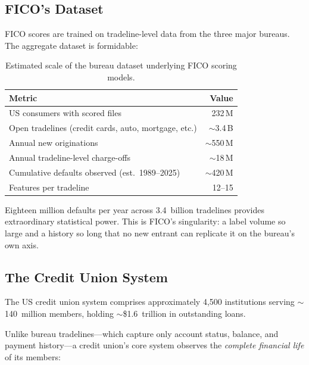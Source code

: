 \documentclass[11pt,twocolumn]{article}
\begin{document}
\subsection{FICO's Dataset}

FICO scores are trained on tradeline-level data from the three major bureaus. The aggregate dataset is formidable:

\begin{table}[H]
\centering
\small
\begin{tabular}{@{}lr@{}}
\toprule
\textbf{Metric} & \textbf{Value} \\
\midrule
US consumers with scored files & 232\,M \\
Open tradelines (credit cards, auto, mortgage, etc.) & $\sim$3.4\,B \\
Annual new originations & $\sim$550\,M \\
Annual tradeline-level charge-offs & $\sim$18\,M \\
Cumulative defaults observed (est.\ 1989--2025) & $\sim$420\,M \\
Features per tradeline & 12--15 \\
\bottomrule
\end{tabular}
\caption{Estimated scale of the bureau dataset underlying FICO scoring models.}
\label{tab:fico}
\end{table}

Eighteen million defaults per year across 3.4~billion tradelines provides extraordinary statistical power. This is FICO's singularity: a label volume so large and a history so long that no new entrant can replicate it on the bureau's own axis.

\subsection{The Credit Union System}

The US credit union system comprises approximately 4,500 institutions serving $\sim$140~million members, holding $\sim$\$1.6~trillion in outstanding loans.

Unlike bureau tradelines---which capture only account status, balance, and payment history---a credit union's core system observes the \emph{complete financial life} of its members:
\end{document}
